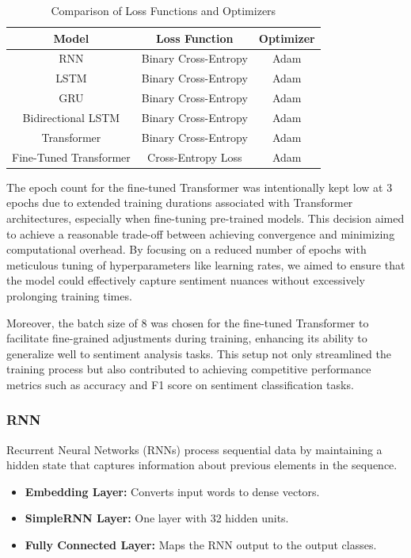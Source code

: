 \documentclass{article}
\begin{document}
\begin{table}[H]
\centering
\begin{tabular}{|c|c|c|}
\hline
\textbf{Model} & \textbf{Loss Function} & \textbf{Optimizer} \\
\hline
RNN & Binary Cross-Entropy & Adam \\
LSTM & Binary Cross-Entropy & Adam \\
GRU & Binary Cross-Entropy & Adam \\
Bidirectional LSTM & Binary Cross-Entropy & Adam \\
Transformer & Binary Cross-Entropy & Adam \\
Fine-Tuned Transformer & Cross-Entropy Loss & Adam \\
\hline
\end{tabular}
\caption{Comparison of Loss Functions and Optimizers}
\label{table:loss-optimizer}
\end{table}
The epoch count for the fine-tuned Transformer was intentionally kept low at 3 epochs due to extended training durations associated with Transformer architectures, especially when fine-tuning pre-trained models. This decision aimed to achieve a reasonable trade-off between achieving convergence and minimizing computational overhead. By focusing on a reduced number of epochs with meticulous tuning of hyperparameters like learning rates, we aimed to ensure that the model could effectively capture sentiment nuances without excessively prolonging training times.

Moreover, the batch size of 8 was chosen for the fine-tuned Transformer to facilitate fine-grained adjustments during training, enhancing its ability to generalize well to sentiment analysis tasks. This setup not only streamlined the training process but also contributed to achieving competitive performance metrics such as accuracy and F1 score on sentiment classification tasks.

\subsubsection{RNN}
Recurrent Neural Networks (RNNs) process sequential data by maintaining a hidden state that captures information about previous elements in the sequence.

\begin{itemize}
    \item \textbf{Embedding Layer:} Converts input words to dense vectors.
    \item \textbf{SimpleRNN Layer:} One layer with 32 hidden units.
    \item \textbf{Fully Connected Layer:} Maps the RNN output to the output classes.
\end{itemize}
\end{document}
